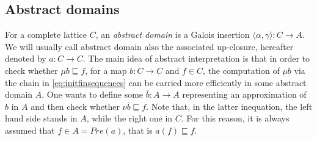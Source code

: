 \documentclass{llncs}
\begin{document}
\subsection{Abstract domains}
%
%
%
For a complete lattice $C$, an \emph{abstract domain} is a Galois insertion $\langle \alpha, \gamma\rangle \colon C \to A$. We will usually call abstract domain also the associated  up-closure, hereafter denoted by $a\colon C \to C$. 
The main idea of abstract interpretation is that in order to check whether $\mu b \sqsubseteq f$, for a map $b\colon C \to C$ and $f\in C$, the computation of $\mu b$ via the chain in \eqref{eq:initfinsequences} can be carried more efficiently in some abstract domain $A$. One wants to define some $\overline{b}\colon A\to A$ representing an approximation of $b$ in $A$ and then check whether $\nu \overline{b} \sqsubseteq f$. Note that, in the latter inequation, the left hand side  stands in $A$, while the right one in $C$. For this reason, it is always assumed that $f\in A=Pre(a)$, that is $a(f)\sqsubseteq f$.
\end{document}
